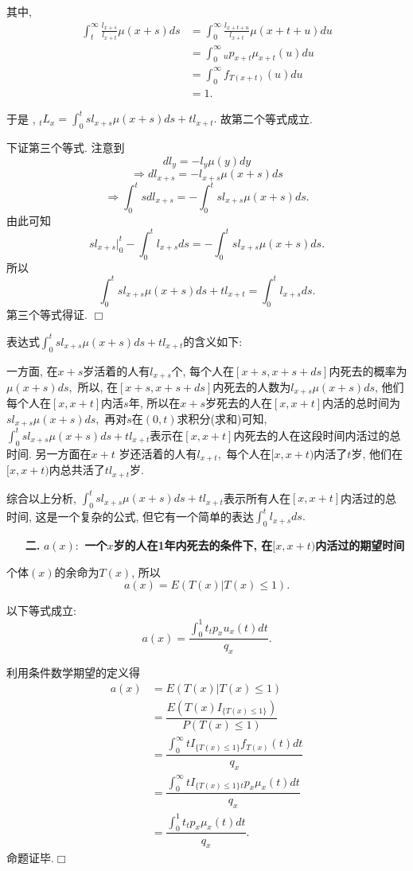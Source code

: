 \documentclass[a4paper,10pt]{ctexbook}
\newcommand{\hei}{\CJKfamily{hei}}      %
\def\qed{\hfill$\Box$\medskip}
\begin{document}
其中,\begin{align*}
    \int_t^{\infty}\frac{l_{x+s}}{l_{x+t}}\mu(x+s)ds
     & =\int_0^{\infty}\frac{l_{x+t+u}}{l_{x+t}}\mu(x+t+u)du \\
     & =\int_0^{\infty}{}_up_{x+t}\mu_{x+t}(u)du             \\
     & =\int_0^{\infty}f_{T{(x+t)}}(u)du                     \\
     & =1.
\end{align*}

于是 , ${}_tL_x=\int_0^tsl_{x+s}\mu(x+s)ds+tl_{x+t}.$ 故第二个等式成立.


下证第三个等式. 注意到
$$dl_y=-l_y\mu(y)dy$$
$$\Rightarrow dl_{x+s}=-l_{x+s}\mu(x+s)ds$$
$$\Rightarrow\int_0^tsdl_{x+s}=-\int_0^tsl_{x+s}\mu(x+s)ds.$$
由此可知$$sl_{x+s}\vert^{t}_{0}-\int_0^tl_{x+s}ds=-\int_0^tsl_{x+s}\mu(x+s)ds.$$
所以
$$\int_0^tsl_{x+s}\mu(x+s)ds+tl_{x+t}=\int_0^tl_{x+s}ds.$$
第三个等式得证.
\qed

表达式$\int_0^tsl_{x+s}\mu(x+s)ds+tl_{x+t}$的含义如下:

\noindent 一方面, 在$x+s$岁活着的人有$l_{x+s}$个, 每个人在$[x+s,x+s+ds]$内死去的概率为$\mu(x+s)ds,$ 所以, 在$[x+s,x+s+ds]$内死去的人数为$l_{x+s}\mu(x+s)ds$, 他们每个人在$[x,x+t]$内活$s$年, 所以在$x+s$岁死去的人在$[x,x+t]$内活的总时间为$sl_{x+s}\mu(x+s)ds,$ 再对$s$在$(0,t)$求积分(求和)可知, $\int_0^tsl_{x+s}\mu(x+s)ds+tl_{x+t}$表示在$[x,x+t]$内死去的人在这段时间内活过的总时间. 另一方面在$x+t$ 岁还活着的人有$l_{x+t},$ 每个人在$[x,x+t)$内活了$t$岁, 他们在$[x,x+t)$内总共活了$tl_{x+t}$岁.

综合以上分析, $\int_0^tsl_{x+s}\mu(x+s)ds+tl_{x+t}$表示所有人在$[x,x+t]$内活过的总时间, 这是一个复杂的公式, 但它有一个简单的表达$\int_0^tl_{x+s}ds.$

\begin{itemize}
    \item[{\bf\hei 二.}]{\bf\hei $a(x):$ 一个$x$岁的人在1年内死去的条件下, 在$[x,x+t)$内活过的期望时间}
\end{itemize}

个体$(x)$的余命为$T(x)$, 所以$$a(x)=E(T(x)|T(x)\le1).$$
\begin{proposition}以下等式成立:
    $$a(x)=\dfrac {\int_0^1t{}_tp_xu_x(t)dt}{q_x}.$$
\end{proposition}
\proof 利用条件数学期望的定义得
\begin{align*}
    a(x) & =E(T(x)|T(x)\le1)                                                \\
         & =\dfrac {E(T(x)I_{\{T(x)\le1\}})}{P(T(x)\le1)}                   \\
         & =\dfrac {\int_0^{\infty}tI_{\{T(x)\le1\}}f_{T(x)}(t)dt}{q_x}     \\
         & =\dfrac {\int_0^{\infty}tI_{\{T(x)\le1\}}{}_tp_x\mu_x(t)dt}{q_x} \\
         & =\dfrac {\int_0^1t{}_tp_x\mu_x(t)dt}{q_x}.
\end{align*}
命题证毕.\qed
\end{document}
